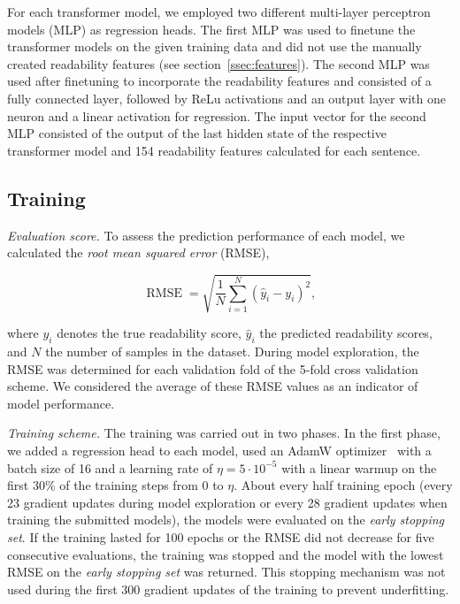 \documentclass[11pt,a4paper]{article}
\DeclareMathOperator{\RMSE}{RMSE}
\begin{document}
For each transformer model, we employed two different multi-layer perceptron models (MLP) as regression heads.
The first MLP was used to finetune the transformer models on the given training data and did not use the manually created readability features (see section~\ref{ssec:features}).
The second MLP was used after finetuning to incorporate the readability features and consisted of a fully connected layer, followed by ReLu activations and an output layer with one neuron and a linear activation for regression.
The input vector for the second MLP consisted of the output of the last hidden state of the respective transformer model and 154 readability features calculated for each sentence. 
\subsection{Training}
\label{sec:training}

\emph{Evaluation score.}
To assess the prediction performance of each model, we calculated the \emph{root mean squared error} (RMSE),

\begin{equation*}
    \mbox{$\RMSE = \sqrt {\frac{1}{N} \sum_{i = 1}^{N} (\hat{y}_i - y_i)^2}$},
\end{equation*}

where $y_i$ denotes the true readability score, $\hat{y}_i$ the predicted readability scores, and $N$ the number of samples in the dataset.
During model exploration, the RMSE was determined for each validation fold of the 5-fold cross validation scheme. We considered the average of these RMSE values as an indicator of model performance.

\emph{Training scheme.} The training was carried out in two phases. In the first phase,
we added a regression head to each model, used an AdamW optimizer~\cite{Loshchilov2019} with a batch size of 16 and a learning rate of \mbox{$\eta=5\cdot 10^{-5}$} with a linear warmup on the first 30\% of the training steps from $0$ to $\eta$.
About every half training epoch (every 23 gradient updates during model exploration or every 28 gradient updates when training the submitted models), the models were evaluated on the \emph{early stopping set}.
If the training lasted for 100 epochs or the RMSE did not decrease for five consecutive evaluations, the training was stopped and the model with the lowest RMSE on the \emph{early stopping set} was returned.
This stopping mechanism was not used during the first 300 gradient updates of the training to prevent underfitting.
\end{document}
